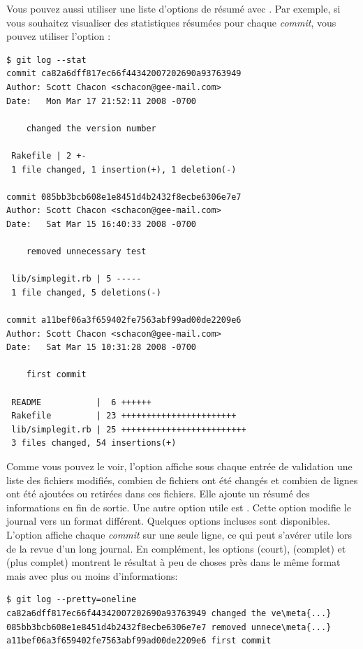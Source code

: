 Vous pouvez aussi utiliser une liste d'options de résumé avec .
Par exemple, si vous souhaitez visualiser des statistiques résumées pour chaque \emph{commit}, vous pouvez utiliser l'option :
\begin{Schunk}
\begin{Verbatim}
$ git log --stat
commit ca82a6dff817ec66f44342007202690a93763949
Author: Scott Chacon <schacon@gee-mail.com>
Date:   Mon Mar 17 21:52:11 2008 -0700

    changed the version number

 Rakefile | 2 +-
 1 file changed, 1 insertion(+), 1 deletion(-)

commit 085bb3bcb608e1e8451d4b2432f8ecbe6306e7e7
Author: Scott Chacon <schacon@gee-mail.com>
Date:   Sat Mar 15 16:40:33 2008 -0700

    removed unnecessary test

 lib/simplegit.rb | 5 -----
 1 file changed, 5 deletions(-)

commit a11bef06a3f659402fe7563abf99ad00de2209e6
Author: Scott Chacon <schacon@gee-mail.com>
Date:   Sat Mar 15 10:31:28 2008 -0700

    first commit

 README           |  6 ++++++
 Rakefile         | 23 +++++++++++++++++++++++
 lib/simplegit.rb | 25 +++++++++++++++++++++++++
 3 files changed, 54 insertions(+)
\end{Verbatim}
\end{Schunk}

Comme vous pouvez le voir, l'option  affiche sous chaque entrée de validation une liste des fichiers modifiés, combien de fichiers ont été changés et combien de lignes ont été ajoutées ou retirées dans ces fichiers.
Elle ajoute un résumé des informations en fin de sortie.
Une autre option utile est .
Cette option modifie le journal vers un format différent.
Quelques options incluses sont disponibles.
L'option  affiche chaque \emph{commit} sur une seule ligne, ce qui peut s'avérer utile lors de la revue d'un long journal.
En complément, les options  (court),  (complet) et  (plus complet) montrent le résultat à peu de choses près dans le même format mais avec plus ou moins d'informations:
\begin{Schunk}
\begin{Verbatim}[commandchars=\\\{\}]
$ git log --pretty=oneline
ca82a6dff817ec66f44342007202690a93763949 changed the ve\meta{...}
085bb3bcb608e1e8451d4b2432f8ecbe6306e7e7 removed unnece\meta{...}
a11bef06a3f659402fe7563abf99ad00de2209e6 first commit
\end{Verbatim}
\end{Schunk}

